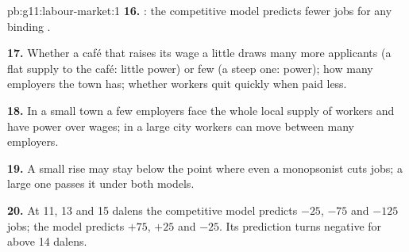 \begin{solution}{pb:g11:labour-market:1}
\textbf{16.} : the competitive model predicts fewer jobs for any binding .

\textbf{17.} Whether a café that raises its wage a little draws many more applicants (a flat supply to the café: little power) or few (a steep one: power); how many employers
the town has; whether workers quit quickly when paid less.

\textbf{18.} In a small town a few employers face the whole local supply of workers and have power over wages; in a large city workers can move between many employers.

\textbf{19.} A small rise may stay below the point where even a monopsonist cuts jobs; a large one passes it under both models.

\textbf{20.} At 11, 13 and 15 dalens the competitive model predicts $-25$, $-75$ and $-125$ jobs; the  model predicts $+75$, $+25$ and $-25$. Its prediction turns
negative for  above 14 dalens.
\end{solution}
